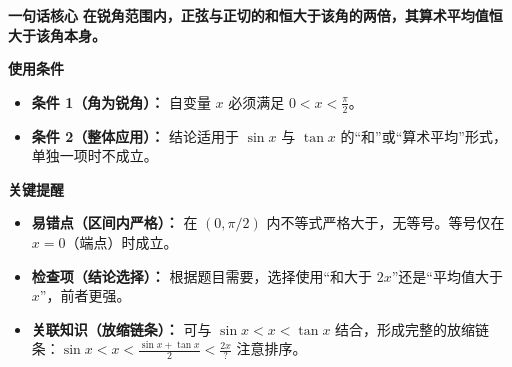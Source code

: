 \begin{summarybox}
\textbf{\textcolor{CSummary}{一句话核心}}
\textbf{在锐角范围内，正弦与正切的和恒大于该角的两倍，其算术平均值恒大于该角本身。}

\medskip
\textbf{\textcolor{CSummary}{使用条件}}
\begin{itemize}[leftmargin=*, itemsep=0.5em, topsep=0.4em]
    \item \textbf{条件 1（角为锐角）：} 自变量 $x$ 必须满足 $0 < x < \frac{\pi}{2}$。
    \item \textbf{条件 2（整体应用）：} 结论适用于 $\sin x$ 与 $\tan x$ 的“和”或“算术平均”形式，单独一项时不成立。
\end{itemize}

\medskip
\textbf{\textcolor{CSummary}{关键提醒}}
\begin{itemize}[leftmargin=*, itemsep=0.5em, topsep=0.4em]
    \item \textbf{易错点（区间内严格）：} 在 $(0, \pi/2)$ 内不等式严格大于，无等号。等号仅在 $x=0$（端点）时成立。
    \item \textbf{检查项（结论选择）：} 根据题目需要，选择使用“和大于 $2x$”还是“平均值大于 $x$”，前者更强。
    \item \textbf{关联知识（放缩链条）：} 可与 $\sin x < x < \tan x$ 结合，形成完整的放缩链条：$\sin x < x < \frac{\sin x + \tan x}{2} < \frac{2x}{?}$ 注意排序。
\end{itemize}
\end{summarybox}
